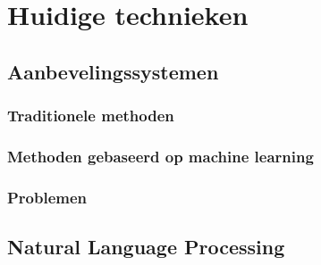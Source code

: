 \chapter{Huidige technieken}
\label{chap:huidige_technieken}
\section{Aanbevelingssystemen}
\label{sec:huidige_technieken_aanbevelingssystemen}

\subsection{Traditionele methoden}

\subsection{Methoden gebaseerd op machine learning}

\subsection{Problemen}

\section{Natural Language Processing}
